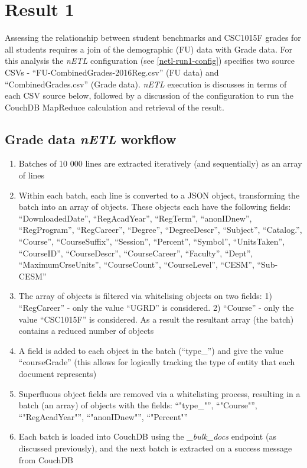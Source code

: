 \section{Result 1}
Assessing the relationship between student benchmarks and CSC1015F grades for all students requires a join of the demographic (FU) data with Grade data. For this analysis the \textit{nETL} configuration (see \ref{netl-run1-config}) specifies two source CSVs - ``FU-CombinedGrades-2016Reg.csv'' (FU data) and ``CombinedGrades.csv'' (Grade data). \textit{nETL} execution is discusses in terms of each CSV source below, followed by a discussion of the configuration to run the CouchDB MapReduce calculation and retrieval of the result.

\subsection*{Grade data \textit{nETL} workflow}
\begin{enumerate}
    \item Batches of 10 000 lines are extracted iteratively (and sequentially) as an array of lines
    \item Within each batch, each line is converted to a JSON object, transforming the batch into an array of objects. These objects each have the following fields: ``DownloadedDate'', ``RegAcadYear'', ``RegTerm'', ``anonIDnew'', ``RegProgram'', ``RegCareer'', ``Degree'', ``DegreeDescr'', ``Subject'', ``Catalog.'', ``Course'', ``CourseSuffix'', ``Session'', ``Percent'', ``Symbol'', ``UnitsTaken'', ``CourseID'', ``CourseDescr'', ``CourseCareer'', ``Faculty'', ``Dept'', ``MaximumCrseUnits'', ``CourseCount'', ``CourseLevel'', ``CESM'', ``Sub-CESM''
    \item The array of objects is filtered via whitelising objects on two fields: 1) ``RegCareer'' - only the value ``UGRD'' is considered. 2) ``Course'' - only the value ``CSC1015F'' is considered. As a result the resultant array (the batch) contains a reduced number of objects
    \item A field is added to each object in the batch (``type\_'') and give the value ``courseGrade'' (this allows for logically tracking the type of entity that each document represents)
    \item Superfluous object fields are removed via a whitelisting process, resulting in a batch (an array) of objects with the fields: ``"type\_"'', ``"Course"'', ``"RegAcadYear"'', ``"anonIDnew"'', ``"Percent"''
    \item Each batch is loaded into CouchDB using the \textit{\_bulk\_docs} endpoint (as discussed previously), and the next batch is extracted on a success message from CouchDB
\end{enumerate}

